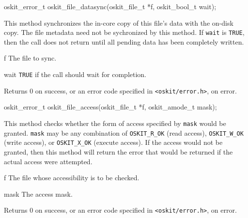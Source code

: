 \begin{apisyn}

	\funcproto oskit_error_t
	oskit_file_datasync(oskit_file_t *f, oskit_bool_t wait); 
\end{apisyn}
\ostofs
\begin{apidesc}
	This method synchronizes the in-core copy of this
	file's data with the on-disk copy.  The file
	metadata need not be sychronized by this method.
	If {\tt wait} is {\tt TRUE}, then the call does not return
	until all pending data has been completely written.
\end{apidesc}
\begin{apiparm}
	\item[f]
		The file to sync.
	\item[wait]
		{\tt TRUE} if the call should wait for completion.
\end{apiparm}
\begin{apiret}
	Returns 0 on success, or an error code specified in
	{\tt <oskit/error.h>}, on error.
\end{apiret}

\begin{apisyn}

	\funcproto oskit_error_t
	oskit_file_access(oskit_file_t *f, oskit_amode_t mask); 
\end{apisyn}
\ostofs
\begin{apidesc}
	This method checks whether the form of access
	specified by {\tt mask} would be granted. 	
	{\tt mask} may be any combination of {\tt OSKIT_R_OK} (read access),
	{\tt OSKIT_W_OK} (write access), or {\tt OSKIT_X_OK} (execute access).
	If the access would not be granted, then this method will return
	the error that would be returned if the	actual access were attempted.
\end{apidesc}
\begin{apiparm}
	\item[f]
		The file whose accessibility is to be checked.
	\item[mask]
		The access mask.
\end{apiparm}
\begin{apiret}
	Returns 0 on success, or an error code specified in
	{\tt <oskit/error.h>}, on error.
\end{apiret}


